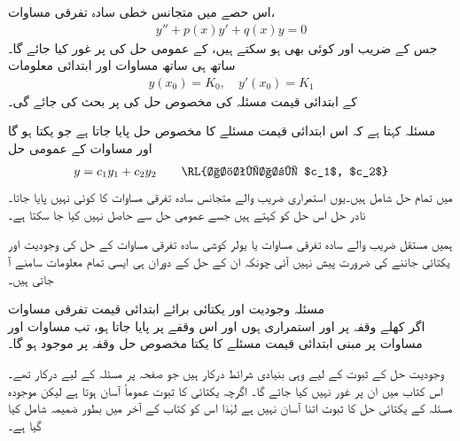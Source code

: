 اس حصے میں متجانس خطی سادہ تفرقی مساوات،
\begin{align}\label{مساوات_سادہ_دو_وجودیت_مخصوص_الف}
y''+p(x)y'+q(x)y=0
\end{align}
جس کے  ضریب   اور  کوئی بھی  ہو سکتے  ہیں، کے عمومی حل کی  پر غور کیا جائے گا۔ساتھ ہی ساتھ مساوات  اور  ابتدائی معلومات
\begin{align}\label{مساوات_سادہ_دو_وجودیت_مخصوص_ب}
y(x_0)=K_0, \quad y'(x_0)=K_1
\end{align}
کے  ابتدائی قیمت مسئلہ کی مخصوص حل کی  پر بحث کی جائے گی۔ 

مسئلہ  کہتا ہے کہ اس ابتدائی قیمت مسئلے کا مخصوص حل پایا جاتا ہے جو یکتا ہو گا اور مساوات  کے عمومی حل
\begin{align}
y=c_1y_1+c_2y_2\quad \quad \text{\RL{اختیاری $c_1$, $c_2$}}
\end{align}
میں تمام حل شامل ہیں۔یوں استمراری  ضریب  والے متجانس سادہ تفرقی مساوات کا کوئی  نہیں پایا جاتا۔نادر حل اس حل کو کہتے ہیں جسے عمومی حل سے حاصل نہیں کیا جا سکتا ہے۔

ہمیں مستقل  ضریب  والے سادہ تفرقی مساوات یا یولر کوشی سادہ تفرقی مساوات کے حل کی وجودیت اور یکتائی جاننے کی ضرورت پیش نہیں آئی چونکہ ان کے حل کے دوران ہی ایسی تمام معلومات سامنے آ جاتی ہیں۔


\quad مسئلہ وجودیت اور یکتائی برائے ابتدائی قیمت تفرقی مساوات\\
اگر کھلے وقفہ  پر   اور   استمراری ہوں اور  اس وقفے پر پایا جاتا ہو، تب   مساوات  اور مساوات  پر مبنی ابتدائی قیمت مسئلے کا  یکتا مخصوص حل  وقفہ  پر  موجود ہو گا۔  

وجودیت حل کے ثبوت کے لیے وہی بنیادی شرائط درکار ہیں جو صفحہ  پر مسئلہ  کے لیے درکار تھے۔اس کتاب میں ان پر غور نہیں کیا جائے گا۔ اگرچہ یکتائی کا ثبوت عموماً آسان ہوتا ہے لیکن موجودہ مسئلہ  کے یکتائی حل کا ثبوت اتنا آسان نہیں ہے لہٰذا اس کو کتاب کے آخر میں بطور ضمیمہ  شامل کیا گیا ہے۔ 

